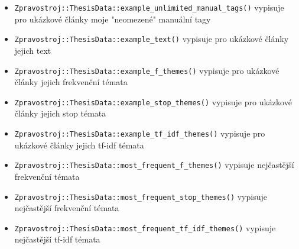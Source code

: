\documentclass[12pt,a4paper]{report}
\begin{document}
\begin{itemize}
	\item \texttt{Zpravostroj::ThesisData::example\_unlimited\_manual\_tags()} vypisuje pro ukázkové články moje "neomezené" manuální tagy
	\item \texttt{Zpravostroj::ThesisData::example\_text()} vypisuje pro ukázkové články jejich text
	\item \texttt{Zpravostroj::ThesisData::example\_f\_themes()} vypisuje pro ukázkové články jejich frekvenční témata
	\item \texttt{Zpravostroj::ThesisData::example\_stop\_themes()} vypisuje pro ukázkové články jejich stop témata
	\item \texttt{Zpravostroj::ThesisData::example\_tf\_idf\_themes()} vypisuje pro ukázkové články jejich tf-idf témata
	\item \texttt{Zpravostroj::ThesisData::most\_frequent\_f\_themes()} vypisuje nejčastější frekvenční témata
	\item \texttt{Zpravostroj::ThesisData::most\_frequent\_stop\_themes()} vypisuje nejčastější frekvenční témata
	\item \texttt{Zpravostroj::ThesisData::most\_frequent\_tf\_idf\_themes()} vypisuje nejčastější tf-idf témata
\end{itemize}
\end{document}

